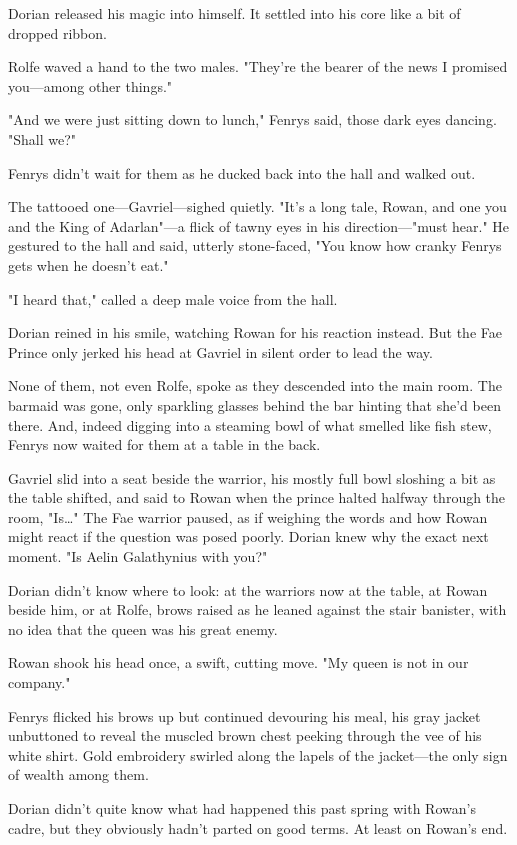 Dorian released his magic into himself. It settled into his core like a bit of dropped ribbon.

Rolfe waved a hand to the two males. "They're the bearer of the news I promised you---among other things."

"And we were just sitting down to lunch," Fenrys said, those dark eyes dancing. "Shall we?"

Fenrys didn't wait for them as he ducked back into the hall and walked out.

The tattooed one---Gavriel---sighed quietly. "It's a long tale, Rowan, and one you and the King of Adarlan"---a flick of tawny eyes in his direction---"must hear." He gestured to the hall and said, utterly stone-faced, "You know how cranky Fenrys gets when he doesn't eat."

"I heard that," called a deep male voice from the hall.

Dorian reined in his smile, watching Rowan for his reaction instead. But the Fae Prince only jerked his head at Gavriel in silent order to lead the way.

None of them, not even Rolfe, spoke as they descended into the main room. The barmaid was gone, only sparkling glasses behind the bar hinting that she'd been there. And, indeed digging into a steaming bowl of what smelled like fish stew, Fenrys now waited for them at a table in the back.

Gavriel slid into a seat beside the warrior, his mostly full bowl sloshing a bit as the table shifted, and said to Rowan when the prince halted halfway through the room, "Is\ldots" The Fae warrior paused, as if weighing the words and how Rowan might react if the question was posed poorly. Dorian knew why the exact next moment. "Is Aelin Galathynius with you?"

Dorian didn't know where to look: at the warriors now at the table, at Rowan beside him, or at Rolfe, brows raised as he leaned against the stair banister, with no idea that the queen was his great enemy.

Rowan shook his head once, a swift, cutting move. "My queen is not in our company."

Fenrys flicked his brows up but continued devouring his meal, his gray jacket unbuttoned to reveal the muscled brown chest peeking through the vee of his white shirt. Gold embroidery swirled along the lapels of the jacket---the only sign of wealth among them.

Dorian didn't quite know what had happened this past spring with Rowan's cadre, but  they obviously hadn't parted on good terms. At least on Rowan's end.

